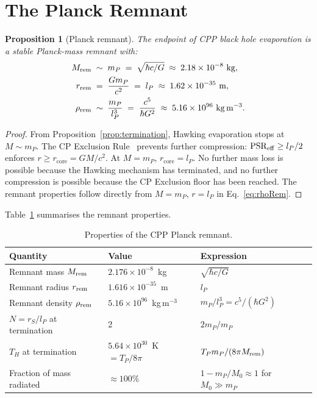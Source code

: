 \documentclass[12pt]{article}
\newtheorem{proposition}[theorem]{Proposition}
\newcommand{\lP}{l_P}
\newcommand{\mP}{m_P}
\newcommand{\TP}{T_P}
\newcommand{\rS}{r_S}
\newcommand{\rcore}{r_{\mathrm{core}}}
\newcommand{\PSR}{\mathrm{PSR}}
\begin{document}
\section{The Planck Remnant}
\label{sec:remnant}

\begin{proposition}[Planck remnant]
\label{prop:remnant}
The endpoint of CPP black hole evaporation is a stable Planck-mass
remnant with:
\begin{align}
  M_{\rm rem} &\;\sim\; \mP \;=\; \sqrt{\hbar c/G}
  \;\approx\; 2.18\times 10^{-8}\ \mathrm{kg}, \label{eq:Mrem}\\
  r_{\rm rem} &\;=\; \frac{G\mP}{c^2} \;=\; \lP
  \;\approx\; 1.62\times 10^{-35}\ \mathrm{m}, \label{eq:rrem}\\
  \rho_{\rm rem} &\;\sim\; \frac{\mP}{\lP^3}
  \;=\; \frac{c^5}{\hbar G^2}
  \;\approx\; 5.16\times 10^{96}\ \mathrm{kg\,m^{-3}}. \label{eq:rhoRem}
\end{align}
\end{proposition}

\begin{proof}
From Proposition~\ref{prop:termination}, Hawking evaporation stops at
$M \sim \mP$.  The CP Exclusion Rule~\cite{c1} prevents further
compression: $\PSR_{\rm eff} \geq \lP/2$ enforces $r \geq \rcore = GM/c^2$.
At $M = \mP$, $\rcore = \lP$.  No further mass loss is possible
because the Hawking mechanism has terminated, and no further
compression is possible because the CP Exclusion floor has been
reached.  The remnant properties follow directly from $M = \mP$,
$r = \lP$ in Eq.~\eqref{eq:rhoRem}.
\end{proof}

Table~\ref{tab:remnant} summarises the remnant properties.

\begin{table}[h]
\centering
\caption{Properties of the CPP Planck remnant.}
\label{tab:remnant}
\renewcommand{\arraystretch}{1.35}
\begin{tabular}{@{}lll@{}}
\toprule
Quantity & Value & Expression \\
\midrule
Remnant mass $M_{\rm rem}$
  & $2.176\times 10^{-8}$~kg
  & $\sqrt{\hbar c/G}$ \\
Remnant radius $r_{\rm rem}$
  & $1.616\times 10^{-35}$~m
  & $\lP$ \\
Remnant density $\rho_{\rm rem}$
  & $5.16\times 10^{96}$~kg\,m$^{-3}$
  & $\mP/\lP^3 = c^5/(\hbar G^2)$ \\
$N = \rS/\lP$ at termination
  & 2 & $2\mP/\mP$ \\
$T_H$ at termination
  & $5.64\times 10^{30}$~K $= \TP/8\pi$
  & $\TP\mP/(8\pi M_{\rm rem})$ \\
Fraction of mass radiated
  & $\approx 100\%$
  & $1 - \mP/M_0 \approx 1$ for $M_0 \gg \mP$ \\
\bottomrule
\end{tabular}
\end{table}
\end{document}
